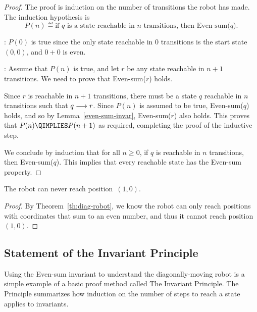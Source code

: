 \begin{proof}
The proof is induction on the number of transitions the robot has
made.  The induction hypothesis is
\[
P(n) \eqdef \text{if $q$ is a state reachable in $n$ transitions, then
  Even-sum($q$)}.
\]

: $P(0)$ is true since the only state reachable in 0
transitions is the start state $(0, 0)$, and $0 + 0$ is even.

: Assume that $P(n)$ is true, and let $r$ be any
state reachable in $n+1$ transitions. We need to prove that
Even-sum($r$) holds.

Since $r$ is reachable in $n+1$ transitions, there must be a state
$q$ reachable in $n$ transitions such that $q \mathrel{\longrightarrow} r$.  Since
$P(n)$ is assumed to be true, Even-sum($q$) holds, and so by
Lemma~\ref{even-sum-invar}, Even-sum($r$) also holds.  This proves
that $P(n) \QIMPLIES P(n + 1)$ as required, completing the proof of
the inductive step.

We conclude by induction that for all $n \ge 0$, if $q$ is reachable
in $n$ transitions, then Even-sum($q$).  This implies that every
reachable state has the Even-sum property.

\end{proof}

\begin{corollary}\label{cor:diag-robot}
The robot can never reach position~$(1, 0)$.
\end{corollary}

\begin{proof}
By Theorem~\ref{th:diag-robot}, we know the robot can only reach
positions with coordinates that sum to an even number, and thus it
cannot reach position~$(1, 0)$.
\end{proof}

\iffalse
Since this was the first time we proved that a predicate was an
invariant, we were careful to go through all four cases in gory
detail.  As you become more experienced with such proofs, you will
likely become more brief as well.  Indeed, if we were going through
the proof again at a later point in the text, we might simply note
that the sum of the coordinates after step~$t + 1$ can be only $x +
y$, $x + y + 2$ or $x + y - 2$ and therefore that the sum is even.
\fi

\subsection{Statement of the Invariant Principle}\label{subsec:invariant}
Using the Even-sum invariant to understand the diagonally-moving robot
is a simple example of a basic proof method called The Invariant
Principle.  The Principle summarizes how induction on the number of
steps to reach a state applies to invariants.   

